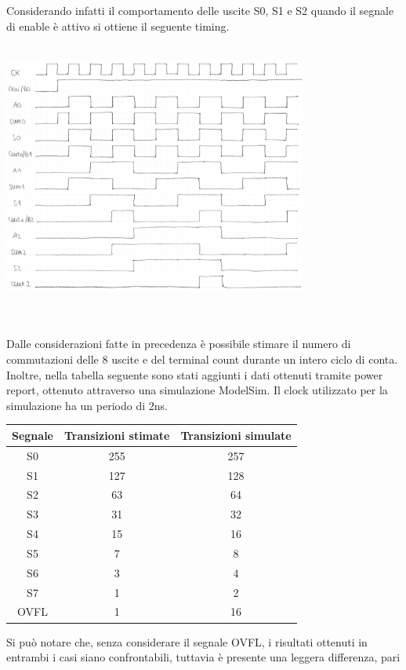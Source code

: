\documentclass[11pt,  english, makeidx, a4paper, titlepage, oneside]{book}
\begin{document}
Considerando infatti il comportamento delle uscite S0, S1 e S2 quando il segnale di 
enable è attivo si ottiene il seguente timing.
\\\\
\centerline{\includegraphics[width=10cm]{./img/Lab_1/Es_5/Contatore.png}}
\\\\
Dalle considerazioni fatte in precedenza è possibile stimare il numero
di commutazioni delle 8 uscite e del terminal count durante 
un intero ciclo di conta. Inoltre, nella tabella seguente sono stati
aggiunti i dati ottenuti tramite power report, ottenuto attraverso 
una simulazione ModelSim. Il clock utilizzato per la simulazione ha un periodo
di 2ns.
\\
\begin{center}
	\begin{tabular}{|c|c|c|}
	\hline
	Segnale & Transizioni stimate & Transizioni simulate \\ 
	\hline
	S0 & 255 & 257 \\
	\hline
	S1 & 127 & 128\\
	\hline
	S2 & 63 & 64\\
	\hline
	S3 & 31 & 32\\
	\hline
	S4 & 15 & 16 \\
	\hline
	S5 & 7 & 8 \\
	\hline
	S6 & 3 & 4 \\
	\hline
	S7 & 1 & 2 \\
	\hline
	OVFL & 1 & 16 \\
	\hline
	\end{tabular}
\end{center}
\vspace{0.3cm}
Si può notare che, senza considerare il segnale OVFL,
i risultati ottenuti in entrambi i casi siano
confrontabili, tuttavia è presente una leggera differenza, pari
\end{document}
